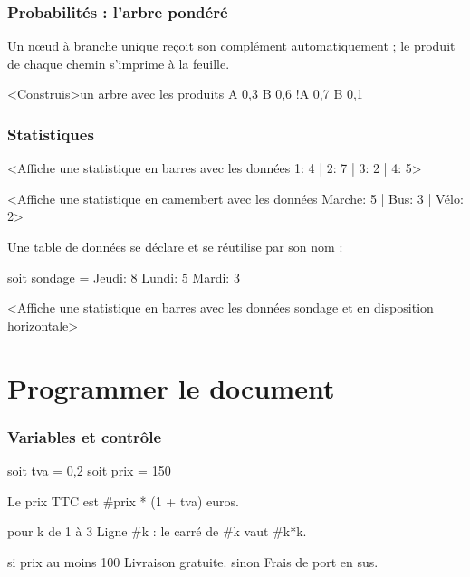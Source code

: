 \documentclass[11pt,a4paper]{article}
\begin{document}
\section{Probabilités : l'arbre pondéré}

Un nœud à branche unique reçoit son complément automatiquement ; le
produit de chaque chemin s'imprime à la feuille.

\begin{code}
<Construis>un arbre avec les produits{
    A 0,3 {
        B 0,6
    }
    !A 0,7 {
        B 0,1
    }
}
\end{code}

\section{Statistiques}

\begin{code}
<Affiche une statistique en barres
    avec les données {1: 4 | 2: 7 | 3: 2 | 4: 5}>

<Affiche une statistique en camembert
    avec les données {Marche: 5 | Bus: 3 | Vélo: 2}>
\end{code}

Une table de données se déclare et se réutilise par son nom :

\begin{code}
soit sondage = {
    Jeudi: 8
    Lundi: 5
    Mardi: 3
}

<Affiche une statistique en barres
    avec les données sondage et en disposition horizontale>
\end{code}

\part{Programmer le document}

\section{Variables et contrôle}

\begin{code}
soit tva = 0,2
soit prix = 150

Le prix TTC est #{prix * (1 + tva)} euros.

pour k de 1 à 3 {
    Ligne #k : le carré de #k vaut #{k*k}.
}

si prix au moins 100 {
    Livraison gratuite.
} sinon {
    Frais de port en sus.
}
\end{code}
\end{document}
